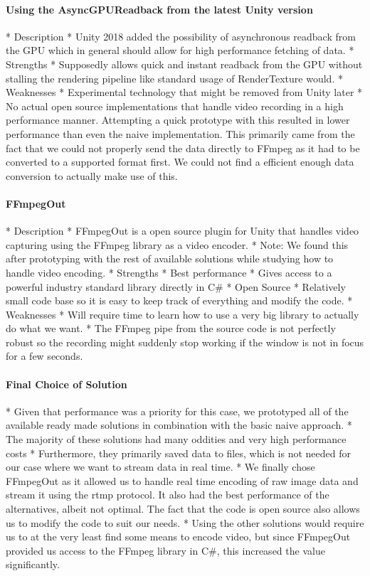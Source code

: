 \paragraph{Using the AsyncGPUReadback from the latest Unity version}
        * Description
            * Unity 2018 added the possibility of asynchronous readback from the GPU which in general should allow for high performance fetching of data. 
        * Strengths
            * Supposedly allows quick and instant readback from the GPU without stalling the rendering pipeline like standard usage of RenderTexture would. 
        * Weaknesses
            * Experimental technology that might be removed from Unity later
            * No actual open source implementations that handle video recording in a high performance manner. Attempting a quick prototype with this resulted in lower performance than even the naive implementation. This primarily came from the fact that we could not properly send the data directly to FFmpeg as it had to be converted to a supported format first. We could not find a efficient enough data conversion to actually make use of this. 
\paragraph{FFmpegOut}
        * Description
            * FFmpegOut is a open source plugin for Unity that handles video capturing using the FFmpeg library as a video encoder. 
            * Note: We found this after prototyping with the rest of available solutions while studying how to handle video encoding. 
        * Strengths
            * Best performance
            * Gives access to a powerful industry standard library directly in C\#
            * Open Source
            * Relatively small code base so it is easy to keep track of everything and modify the code. 
        * Weaknesses
            * Will require time to learn how to use a very big library to actually do what we want. 
            * The FFmpeg pipe from the source code is not perfectly robust so the recording might suddenly stop working if the window is not in focus for a few seconds. 
\paragraph{Final Choice of Solution}
    * Given that performance was a priority for this case, we prototyped all of the available ready made solutions in combination with the basic naive approach.
    * The majority of these solutions had many oddities and very high performance costs
    * Furthermore, they primarily saved data to files, which is not needed for our case where we want to stream data in real time. 
    * We finally chose FFmpegOut as it allowed us to handle real time encoding of raw image data and stream it using the rtmp protocol. It also had the best performance of the alternatives, albeit not optimal. The fact that the code is open source also allows us to modify the code to suit our needs. 
    * Using the other solutions would require us to at the very least find some means to encode video, but since FFmpegOut provided us access to the FFmpeg library in C\#, this increased the value significantly. 
    
